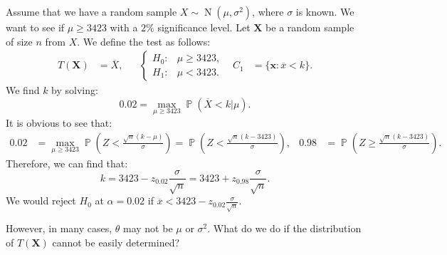 \documentclass{huhtakm-template-book-v2}
\DeclareMathOperator{\prob}{\mathbb{P}}
\DeclareMathOperator{\N}{N}
\begin{document}
    \begin{eg}
        Assume that we have a random sample $X\sim\N(\mu,\sigma^{2})$, where $\sigma$ is known. We want to see if $\mu\geq 3423$ with a $2\%$ significance level. Let $\mathbf{X}$ be a random sample of size $n$ from $X$. We define the test as follows:
        \begin{align*}
            T(\mathbf{X})&=\overline{X}, & &\begin{cases}
                H_{0}: &\mu\geq3423,\\
                H_{1}: &\mu<3423.
            \end{cases} & C_{1}&=\{\mathbf{x}:\overline{x}<k\}.
        \end{align*}
        We find $k$ by solving:
        \begin{equation*}
            0.02=\max_{\mu\geq3423}\prob(\overline{X}<k|\mu).
        \end{equation*}
        It is obvious to see that:
        \begin{align*}
            0.02&=\max_{\mu\geq3423}\prob\left(Z<\frac{\sqrt{n}(k-\mu)}{\sigma}\right)=\prob\left(Z<\frac{\sqrt{n}(k-3423)}{\sigma}\right), & 0.98&=\prob\left(Z\geq\frac{\sqrt{n}(k-3423)}{\sigma}\right).
        \end{align*}
        Therefore, we can find that:
        \begin{equation*}
            k=3423-z_{0.02}\frac{\sigma}{\sqrt{n}}=3423+z_{0.98}\frac{\sigma}{\sqrt{n}}.
        \end{equation*}
        We would reject $H_{0}$ at $\alpha=0.02$ if $\overline{x}<3423-z_{0.02}\frac{\sigma}{\sqrt{n}}$.
    \end{eg}
    However, in many cases, $\theta$ may not be $\mu$ or $\sigma^{2}$. What do we do if the distribution of $T(\mathbf{X})$ cannot be easily determined?
    \newpage
    
\end{document}
